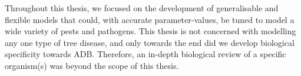 Throughout this thesis, we focused on the development of generalisable and flexible models that could, with accurate parameter-values, be tuned to model a wide variety of pests and pathogens. This thesis is not concerned with modelling any one type of tree disease, and only towards the end did we develop biological specificity towards ADB. Therefore, an in-depth biological review of a specific organism(s) was beyond the scope of this thesis.